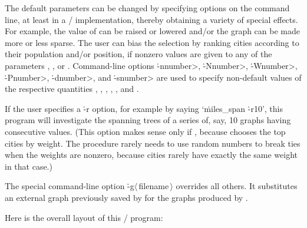 The default parameters can be changed by specifying options on the
command line, at least in a \UNIX/ implementation, thereby obtaining a
variety of special effects. For example, the value of  can be
raised or lowered and/or the graph can be made more or less sparse.
The user can bias the selection by ranking cities according to their
population and/or position, if nonzero values are given to any of the
parameters , , or .
Command-line options \.{-n}\<number>, \.{-N}\<number>, \.{-W}\<number>,
\.{-P}\<number>, \.{-d}\<number>, and \.{-s}\<number>
are used to specify non-default values of the respective quantities ,
, , , , and .

If the user specifies a \.{-r} option, for example by saying `\.{miles\_span}
\.{-r10}', this program will investigate the spanning trees of a
series of, say, 10 graphs having consecutive  values. (This
option makes sense only if ,
because  chooses the top  cities by weight. The procedure
rarely
needs to use random numbers to break ties when the weights are nonzero,
because cities rarely have exactly the same weight in that case.)

The special command-line option \.{-g}$\langle\,$filename$\,\rangle$
overrides all others. It substitutes an external graph previously saved by
 for the graphs produced by .


Here is the overall layout of this \CEE/ program:

